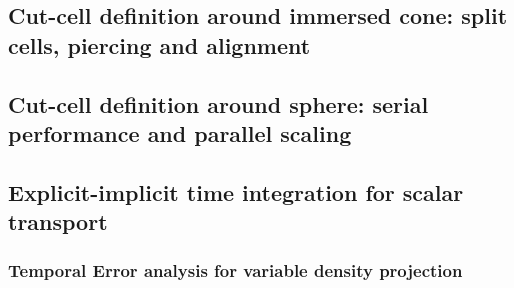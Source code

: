 \documentclass[12pt]{article}
\begin{document}



\subsection{Cut-cell definition around immersed cone: split cells, piercing and alignment}


\subsection{Cut-cell definition around sphere: serial performance and parallel scaling}


\subsection{Explicit-implicit time integration for scalar transport}


\subsubsection{Temporal Error analysis for variable density projection}

\label{sec:saad_cc_temporal_error}
\end{document}
